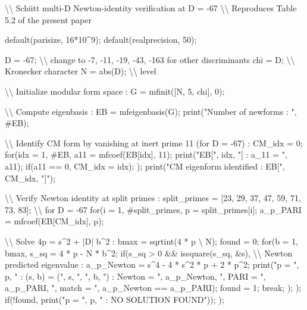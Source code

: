 \documentclass[
  11pt,
  a4paper,
]{amsart}
\newenvironment{Shaded}{}{}
\newcommand{\NormalTok}[1]{#1}
\begin{document}
\begin{Shaded}
\begin{Highlighting}[]
\NormalTok{\textbackslash{}\textbackslash{} Schütt multi{-}D Newton{-}identity verification at D = {-}67}
\NormalTok{\textbackslash{}\textbackslash{} Reproduces Table 5.2 of the present paper}

\NormalTok{default(parisize, 16*10\^{}9);}
\NormalTok{default(realprecision, 50);}

\NormalTok{D = {-}67;  \textbackslash{}\textbackslash{} change to {-}7, {-}11, {-}19, {-}43, {-}163 for other discriminants}
\NormalTok{chi = D;  \textbackslash{}\textbackslash{} Kronecker character}
\NormalTok{N = abs(D);  \textbackslash{}\textbackslash{} level}

\NormalTok{\textbackslash{}\textbackslash{} Initialize modular form space :}
\NormalTok{G = mfinit([N, 5, chi], 0);}

\NormalTok{\textbackslash{}\textbackslash{} Compute eigenbasis :}
\NormalTok{EB = mfeigenbasis(G);}
\NormalTok{print("Number of newforms : ", \#EB);}

\NormalTok{\textbackslash{}\textbackslash{} Identify CM form by vanishing at inert prime 11 (for D = {-}67) :}
\NormalTok{CM\_idx = 0;}
\NormalTok{for(idx = 1, \#EB,}
\NormalTok{    a11 = mfcoef(EB[idx], 11);}
\NormalTok{    print("EB[", idx, "] : a\_11 = ", a11);}
\NormalTok{    if(a11 == 0, CM\_idx = idx);}
\NormalTok{);}
\NormalTok{print("CM eigenform identified : EB[", CM\_idx, "]");}

\NormalTok{\textbackslash{}\textbackslash{} Verify Newton identity at split primes :}
\NormalTok{split\_primes = [23, 29, 37, 47, 59, 71, 73, 83];  \textbackslash{}\textbackslash{} for D = {-}67}
\NormalTok{for(i = 1, \#split\_primes,}
\NormalTok{    p = split\_primes[i];}
\NormalTok{    a\_p\_PARI = mfcoef(EB[CM\_idx], p);}
    
\NormalTok{    \textbackslash{}\textbackslash{} Solve 4p = s\^{}2 + |D| b\^{}2 :}
\NormalTok{    bmax = sqrtint(4 * p \textbackslash{} N);}
\NormalTok{    found = 0;}
\NormalTok{    for(b = 1, bmax,}
\NormalTok{        s\_sq = 4 * p {-} N * b\^{}2;}
\NormalTok{        if(s\_sq \textgreater{} 0 \&\& issquare(s\_sq, \&s),}
\NormalTok{            \textbackslash{}\textbackslash{} Newton predicted eigenvalue :}
\NormalTok{            a\_p\_Newton = s\^{}4 {-} 4 * s\^{}2 * p + 2 * p\^{}2;}
\NormalTok{            print("p = ", p, " : (s, b) = (", s, ", ", b, ") : Newton = ", a\_p\_Newton, ", PARI = ", a\_p\_PARI, ", match = ", a\_p\_Newton == a\_p\_PARI);}
\NormalTok{            found = 1;}
\NormalTok{            break;}
\NormalTok{        );}
\NormalTok{    );}
\NormalTok{    if(!found, print("p = ", p, " : NO SOLUTION FOUND"));}
\NormalTok{);}
\end{Highlighting}
\end{Shaded}
\end{document}
